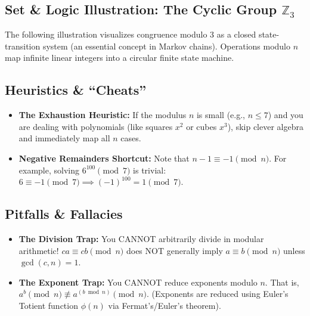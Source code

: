 \documentclass[11pt]{article}
\begin{document}
\subsection{Set \& Logic Illustration: The Cyclic Group $\mathbb{Z}_3$}
The following illustration visualizes congruence modulo 3 as a closed state-transition system (an essential concept in Markov chains). Operations modulo $n$ map infinite linear integers into a circular finite state machine. 

\begin{center}
\end{center}

\subsection{Heuristics \& ``Cheats''}
\begin{itemize}
    \item \textbf{The Exhaustion Heuristic:} If the modulus $n$ is small (e.g., $n \le 7$) and you are dealing with polynomials (like squares $x^2$ or cubes $x^3$), skip clever algebra and immediately map all $n$ cases. 
    \item \textbf{Negative Remainders Shortcut:} Note that $n - 1 \equiv -1 \pmod n$. For example, solving $6^{100} \pmod 7$ is trivial: $6 \equiv -1 \pmod 7 \implies (-1)^{100} = 1 \pmod 7$.
\end{itemize}

\subsection{Pitfalls \& Fallacies}
\begin{itemize}
    \item \textbf{The Division Trap:} You CANNOT arbitrarily divide in modular arithmetic! $ca \equiv cb \pmod n$ does NOT generally imply $a \equiv b \pmod n$ unless $\gcd(c, n) = 1$.
    \item \textbf{The Exponent Trap:} You CANNOT reduce exponents modulo $n$. That is, $a^{b} \pmod n \not\equiv a^{(b \bmod n)} \pmod n$. (Exponents are reduced using Euler's Totient function $\phi(n)$ via Fermat's/Euler's theorem).
\end{itemize}
\end{document}
